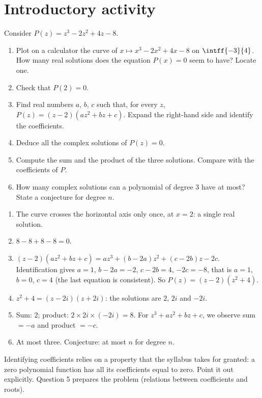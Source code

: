 \section{Introductory activity}
\begin{activity}
Consider $P(z)=z^3-2z^2+4z-8$.
\begin{enumerate}
\item Plot on a calculator the curve of $x\mapsto x^3-2x^2+4x-8$ on $\intff{-3}{4}$. How many real solutions does the equation $P(x)=0$ seem to have? Locate one.
\item Check that $P(2)=0$.
\item Find real numbers $a$, $b$, $c$ such that, for every $z$, $P(z)=(z-2)\left(az^2+bz+c\right)$. Expand the right-hand side and identify the coefficients.
\item Deduce all the complex solutions of $P(z)=0$.
\item Compute the sum and the product of the three solutions. Compare with the coefficients of $P$.
\item How many complex solutions can a polynomial of degree $3$ have at most? State a conjecture for degree $n$.
\end{enumerate}
\end{activity}
\begin{solution}[Activity]
\begin{enumerate}
\item The curve crosses the horizontal axis only once, at $x=2$: a single real solution.
\item $8-8+8-8=0$.
\item $(z-2)\left(az^2+bz+c\right)=az^3+(b-2a)z^2+(c-2b)z-2c$. Identification gives $a=1$, $b-2a=-2$, $c-2b=4$, $-2c=-8$, that is $a=1$, $b=0$, $c=4$ (the last equation is consistent). So $P(z)=(z-2)\left(z^2+4\right)$.
\item $z^2+4=(z-2i)(z+2i)$: the solutions are $2$, $2i$ and $-2i$.
\item Sum: $2$; product: $2\times2i\times(-2i)=8$. For $z^3+az^2+bz+c$, we observe sum $=-a$ and product $=-c$.
\item At most three. Conjecture: at most $n$ for degree $n$.
\end{enumerate}
\end{solution}
\begin{teachernote}
Identifying coefficients relies on a property that the syllabus takes for granted: a zero polynomial function has all its coefficients equal to zero. Point it out explicitly. Question 5 prepares the problem (relations between coefficients and roots).
\end{teachernote}


